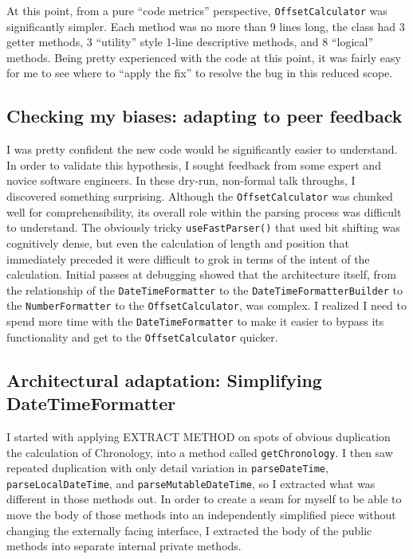At this point, from a pure “code metrics” perspective, \texttt{OffsetCalculator} was significantly simpler. Each method was no more than 9 lines long, the class had 3 getter methods, 3 “utility” style 1-line descriptive methods, and 8 “logical” methods. Being pretty experienced with the code at this point, it was fairly easy for me to see where to “apply the fix” to resolve the bug in this reduced scope. 

\subsection{Checking my biases: adapting to peer feedback}
I was pretty confident the new code would be significantly easier to understand. In order to validate this hypothesis, I sought feedback from some expert and novice software engineers. In these dry-run, non-formal talk throughs, I discovered something surprising. Although the \texttt{OffsetCalculator} was chunked well for comprehensibility, its overall role within the parsing process was difficult to understand. The obviously tricky \texttt{useFastParser()} that used bit shifting was cognitively dense, but even the calculation of length and position that immediately preceded it were difficult to grok in terms of the intent of the calculation. Initial passes at debugging showed that the architecture itself, from the relationship of the \texttt{DateTimeFormatter} to the \texttt{DateTimeFormatterBuilder} to the \texttt{NumberFormatter} to the \texttt{OffsetCalculator}, was complex. I realized I need to spend more time with the \texttt{DateTimeFormatter} to make it easier to bypass its functionality and get to the \texttt{OffsetCalculator} quicker.

\subsection{Architectural adaptation: Simplifying DateTimeFormatter}

I started with applying EXTRACT METHOD on spots of obvious duplication the calculation of Chronology, into a method called \texttt{getChronology}. I then saw repeated duplication with only detail variation in \texttt{parseDateTime}, \texttt{parseLocalDateTime}, and \texttt{parseMutableDateTime}, so I extracted what was different in those methods out. In order to create a seam for myself to be able to move the body of those methods into an independently simplified piece without changing the externally facing interface, I extracted the body of the public methods into separate internal private methods.

